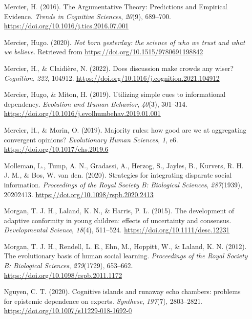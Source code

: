 \documentclass[
  doc,floatsintext]{apa6}
\newlength{\cslhangindent}
\newenvironment{CSLReferences}[2] %
 {\begin{list}{}{%
  \setlength{\itemindent}{0pt}
  \setlength{\leftmargin}{0pt}
  \setlength{\parsep}{0pt}
  \ifodd #1
   \setlength{\leftmargin}{\cslhangindent}
   \setlength{\itemindent}{-1\cslhangindent}
  \fi
  \setlength{\itemsep}{#2\baselineskip}}}
 {\end{list}}
\begin{document}
\begin{CSLReferences}{1}{0}
Mercier, H. (2016). The Argumentative Theory: Predictions and Empirical Evidence. \emph{Trends in Cognitive Sciences}, \emph{20}(9), 689--700. \url{https://doi.org/10.1016/j.tics.2016.07.001}

Mercier, Hugo. (2020). \emph{Not born yesterday: the science of who we trust and what we believe}. Retrieved from \url{https://doi.org/10.1515/9780691198842}

Mercier, H., \& Claidière, N. (2022). Does discussion make crowds any wiser? \emph{Cognition}, \emph{222}, 104912. \url{https://doi.org/10.1016/j.cognition.2021.104912}

Mercier, Hugo, \& Miton, H. (2019). Utilizing simple cues to informational dependency. \emph{Evolution and Human Behavior}, \emph{40}(3), 301--314. \url{https://doi.org/10.1016/j.evolhumbehav.2019.01.001}

Mercier, H., \& Morin, O. (2019). Majority rules: how good are we at aggregating convergent opinions? \emph{Evolutionary Human Sciences}, \emph{1}, e6. \url{https://doi.org/10.1017/ehs.2019.6}

Molleman, L., Tump, A. N., Gradassi, A., Herzog, S., Jayles, B., Kurvers, R. H. J. M., \& Bos, W. van den. (2020). Strategies for integrating disparate social information. \emph{Proceedings of the Royal Society B: Biological Sciences}, \emph{287}(1939), 20202413. \url{https://doi.org/10.1098/rspb.2020.2413}

Morgan, T. J. H., Laland, K. N., \& Harris, P. L. (2015). The development of adaptive conformity in young children: effects of uncertainty and consensus. \emph{Developmental Science}, \emph{18}(4), 511--524. \url{https://doi.org/10.1111/desc.12231}

Morgan, T. J. H., Rendell, L. E., Ehn, M., Hoppitt, W., \& Laland, K. N. (2012). The evolutionary basis of human social learning. \emph{Proceedings of the Royal Society B: Biological Sciences}, \emph{279}(1729), 653--662. \url{https://doi.org/10.1098/rspb.2011.1172}

Nguyen, C. T. (2020). Cognitive islands and runaway echo chambers: problems for epistemic dependence on experts. \emph{Synthese}, \emph{197}(7), 2803--2821. \url{https://doi.org/10.1007/s11229-018-1692-0}


\end{CSLReferences}
\end{document}
